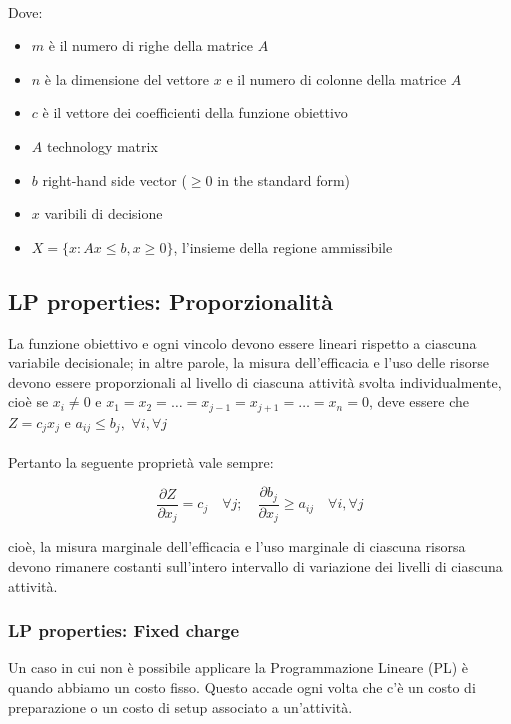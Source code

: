 \documentclass[a4paper, 11pt]{article}
\begin{document}
        \paragraph{} Dove: 
        \begin{itemize}
            \item $m$ è il numero di righe della matrice $A$
            \item $n$ è la dimensione del vettore $x$ e il numero di colonne della matrice $A$
            \item $c$ è il vettore dei coefficienti della funzione obiettivo
            \item $A$ technology matrix
            \item $b$ right-hand side vector ($\geq 0$ in the standard form)
            \item $x$ varibili di decisione
            \item $X = \{ x : Ax \leq b, x \geq 0 \}$, l'insieme della regione ammissibile
        \end{itemize}
            
        \subsection{LP properties: Proporzionalità}
        La funzione obiettivo e ogni vincolo devono essere lineari rispetto a ciascuna variabile decisionale; in altre parole, la misura dell'efficacia e l'uso delle risorse devono essere proporzionali al livello di ciascuna attività svolta individualmente, cioè se $x_i \neq 0$ e $x_1 = x_2 = \ldots = x_{j-1} = x_{j+1} = \ldots = x_n = 0$, deve essere che $Z = c_jx_j$ e $a_{ij} \le b_j, $ $\forall i, \forall j$

        \paragraph{}
        Pertanto la seguente proprietà vale sempre: 

        \[
            \frac{\partial Z}{\partial x_j} = c_j \quad \forall j; \quad  \frac{\partial b_j}{\partial x_j} \ge a_{ij} \quad \forall i, \forall j 
        \]

        cioè, la misura marginale dell'efficacia e l'uso marginale di ciascuna risorsa devono rimanere costanti sull'intero intervallo di variazione dei livelli di ciascuna attività.

        \subsubsection{LP properties: Fixed charge}
        Un caso in cui non è possibile applicare la Programmazione Lineare (PL) è quando abbiamo un costo fisso. Questo accade ogni volta che c'è un costo di preparazione o un costo di setup associato a un'attività.
\end{document}
